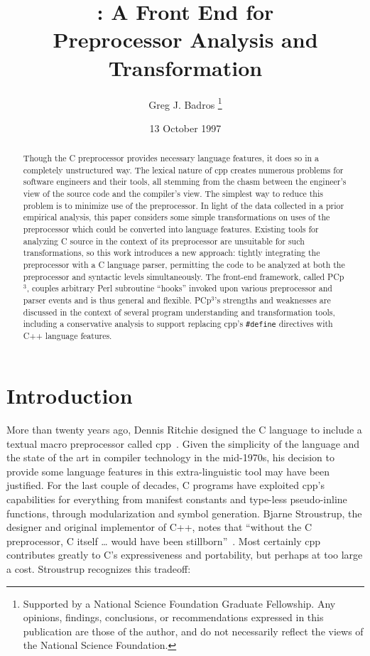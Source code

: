 \documentclass{article}
\title{\pcp{}: A \C{} Front End for \\ Preprocessor Analysis and Transformation}
\author{Greg J. Badros%
  \thanks{Supported by a National Science Foundation
    Graduate Fellowship. Any opinions, findings, conclusions, or
    recommendations expressed in this publication are those of the
    author, and do not necessarily reflect the views of the National
    Science Foundation.}
  \\  \email{gjb@cs.washington.edu}}
\date{13 October 1997}
\newcommand{\pcp}{\mbox{\textsf{PCp}$^3$}}
\newcommand{\Cpp}{\mbox{\textsf{cpp}}}
\newcommand{\CPP}{\mbox{\textsf{C++}}}
\newcommand{\Perl}{\mbox{\textsf{Perl}}}
\newcommand{\C}{\mbox{\textsf{C}}}
\newcommand{\ppd}[1]{\texttt{\##1}}
\begin{document}
\maketitle

\begin{abstract}
\label{sec:abstract}
Though the \C{} preprocessor provides necessary language features, it
does so in a completely unstructured way.  The lexical nature of \Cpp{}
creates numerous problems for software engineers and their tools, all
stemming from the chasm between the engineer's view of the source code
and the compiler's view.  The simplest way to reduce this problem is to
minimize use of the preprocessor.  In light of the data collected in a
prior empirical analysis, this paper considers some simple
transformations on uses of the preprocessor which could be converted
into language features. Existing tools for analyzing \C{} source in the
context of its preprocessor are unsuitable for such transformations, so
this work introduces a new approach: tightly integrating the
preprocessor with a \C{} language parser, permitting the code to be
analyzed at both the preprocessor and syntactic levels simultaneously.
The front-end framework, called \pcp{}, couples arbitrary \Perl{}
subroutine ``hooks'' invoked upon various preprocessor and parser events
and is thus general and flexible. \pcp{}'s strengths and weaknesses are
discussed in the context of several program understanding and
transformation tools, including a conservative analysis to support
replacing \Cpp{}'s \ppd{define} directives with \CPP{} language
features.

\end{abstract}
\bigskip

\section{Introduction}
\label{sec:intro}
More than twenty years ago, Dennis Ritchie designed the \C{} language to
include a textual macro preprocessor called
\Cpp{}~\cite[Ch.~3]{Harbison91}.  Given the simplicity of the language
and the state of the art in compiler technology in the mid-1970s, his
decision to provide some language features in this extra-linguistic tool
may have been justified.  For the last couple of decades, \C{} programs
have exploited \Cpp{}'s capabilities for everything from manifest
constants and type-less pseudo-inline functions, through modularization
and symbol generation.  Bjarne Stroustrup, the designer and original
implementor of \CPP{}, notes that ``without the \C{} preprocessor, \C{}
itself \ldots{} would have been stillborn''~\cite[p.~119]{Stroustrup94}.
Most certainly \Cpp{} contributes greatly to \C{}'s expressiveness and
portability, but perhaps at too large a cost.  Stroustrup recognizes
this tradeoff:
\end{document}
